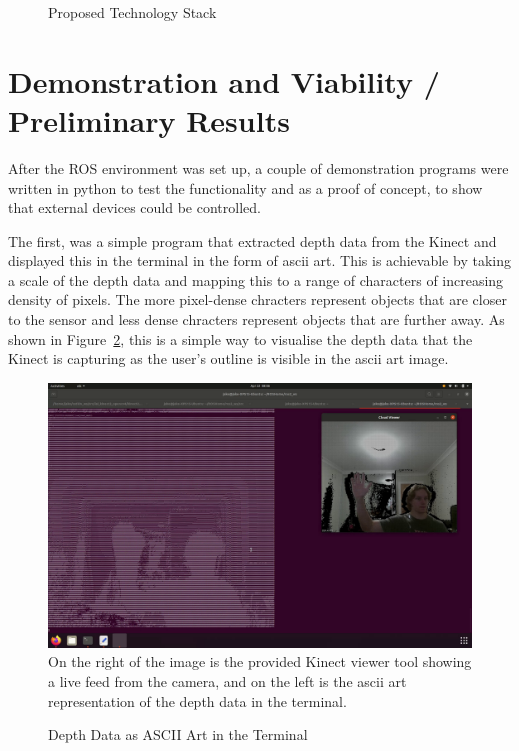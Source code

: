 \begin{figure}[!htb]
    \caption{Proposed Technology Stack}
    \label{fig:tech_stack}
\end{figure}

\newpage

\section{Demonstration and Viability / Preliminary Results}

After the ROS environment was set up, a couple of demonstration programs were written in python to test the functionality and as a proof of concept, to show that external devices could be controlled.

The first, was a simple program that extracted depth data from the Kinect and displayed this in the terminal in the form of ascii art.
This is achievable by taking a scale of the depth data and mapping this to a range of characters of increasing density of pixels.
The more pixel-dense chracters represent objects that are closer to the sensor and less dense chracters represent objects that are further away.
As shown in Figure~\ref{fig:depth_ascii}, this is a simple way to visualise the depth data that the Kinect is capturing as the user's outline is visible in the ascii art image.

\begin{figure}[!htb]
    \caption{Depth Data as ASCII Art in the Terminal}
    \includegraphics[width=\textwidth]{Depth Data Demo.png}
    \small
    On the right of the image is the provided Kinect viewer tool showing a live feed from the camera, and on the left is the ascii art representation of the depth data in the terminal.
    \label{fig:depth_ascii}
\end{figure}

